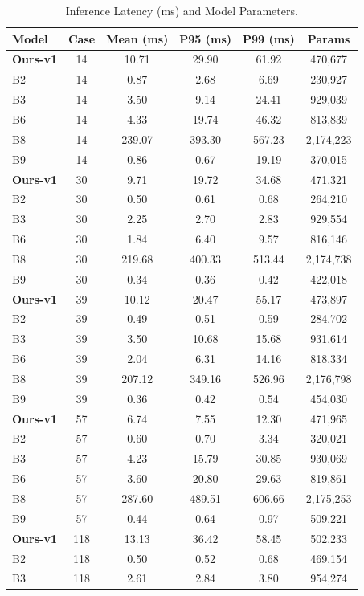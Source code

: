 \begin{table}[t]
\centering
\caption{Inference Latency (ms) and Model Parameters.}
\label{tab:inference}
\begin{tabular}{lccccc}
\toprule
Model & Case & Mean (ms) & P95 (ms) & P99 (ms) & Params \\
\midrule
\textbf{Ours-v1} & 14 & 10.71 & 29.90 & 61.92 & 470,677 \\
B2 & 14 & 0.87 & 2.68 & 6.69 & 230,927 \\
B3 & 14 & 3.50 & 9.14 & 24.41 & 929,039 \\
B6 & 14 & 4.33 & 19.74 & 46.32 & 813,839 \\
B8 & 14 & 239.07 & 393.30 & 567.23 & 2,174,223 \\
B9 & 14 & 0.86 & 0.67 & 19.19 & 370,015 \\
\textbf{Ours-v1} & 30 & 9.71 & 19.72 & 34.68 & 471,321 \\
B2 & 30 & 0.50 & 0.61 & 0.68 & 264,210 \\
B3 & 30 & 2.25 & 2.70 & 2.83 & 929,554 \\
B6 & 30 & 1.84 & 6.40 & 9.57 & 816,146 \\
B8 & 30 & 219.68 & 400.33 & 513.44 & 2,174,738 \\
B9 & 30 & 0.34 & 0.36 & 0.42 & 422,018 \\
\textbf{Ours-v1} & 39 & 10.12 & 20.47 & 55.17 & 473,897 \\
B2 & 39 & 0.49 & 0.51 & 0.59 & 284,702 \\
B3 & 39 & 3.50 & 10.68 & 15.68 & 931,614 \\
B6 & 39 & 2.04 & 6.31 & 14.16 & 818,334 \\
B8 & 39 & 207.12 & 349.16 & 526.96 & 2,176,798 \\
B9 & 39 & 0.36 & 0.42 & 0.54 & 454,030 \\
\textbf{Ours-v1} & 57 & 6.74 & 7.55 & 12.30 & 471,965 \\
B2 & 57 & 0.60 & 0.70 & 3.34 & 320,021 \\
B3 & 57 & 4.23 & 15.79 & 30.85 & 930,069 \\
B6 & 57 & 3.60 & 20.80 & 29.63 & 819,861 \\
B8 & 57 & 287.60 & 489.51 & 606.66 & 2,175,253 \\
B9 & 57 & 0.44 & 0.64 & 0.97 & 509,221 \\
\textbf{Ours-v1} & 118 & 13.13 & 36.42 & 58.45 & 502,233 \\
B2 & 118 & 0.50 & 0.52 & 0.68 & 469,154 \\
B3 & 118 & 2.61 & 2.84 & 3.80 & 954,274 \\

\end{tabular}
\end{table}

